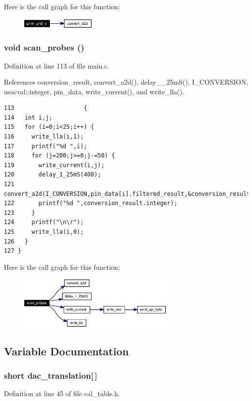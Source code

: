 Here is the call graph for this function:\begin{figure}[H]
\begin{center}
\leavevmode
\includegraphics[width=107pt]{main_8c_a1_cgraph}
\end{center}
\end{figure}
\subsubsection{\setlength{\rightskip}{0pt plus 5cm}void scan\_\-probes ()}\label{main_8c_a5}




Definition at line 113 of file main.c.

References conversion\_\-result, convert\_\-a2d(), delay\_\_\-25m\-S(), I\_\-CONVERSION, ueacval::integer, pin\_\-data, write\_\-current(), and write\_\-lla().

\footnotesize\begin{verbatim}113                    {
114   int i,j;
115   for (i=0;i<25;i++) {
116     write_lla(i,1);
117     printf("%d ",i);
118     for (j=200;j>=0;j-=50) {
119       write_current(i,j);
120       delay_1_25mS(400);     
121       convert_a2d(I_CONVERSION,pin_data[i].filtered_result,&conversion_result,i);
122       printf("%d ",conversion_result.integer);
123     }
124     printf("\n\r");
125     write_lla(i,0);
126   }
127 }
\end{verbatim}\normalsize 




Here is the call graph for this function:\begin{figure}[H]
\begin{center}
\leavevmode
\includegraphics[width=222pt]{main_8c_a5_cgraph}
\end{center}
\end{figure}


\subsection{Variable Documentation}
\subsubsection{\setlength{\rightskip}{0pt plus 5cm}short {\bf dac\_\-translation}[$\,$]}\label{main_8c_a0}




Definition at line 45 of file cal\_\-table.h.
